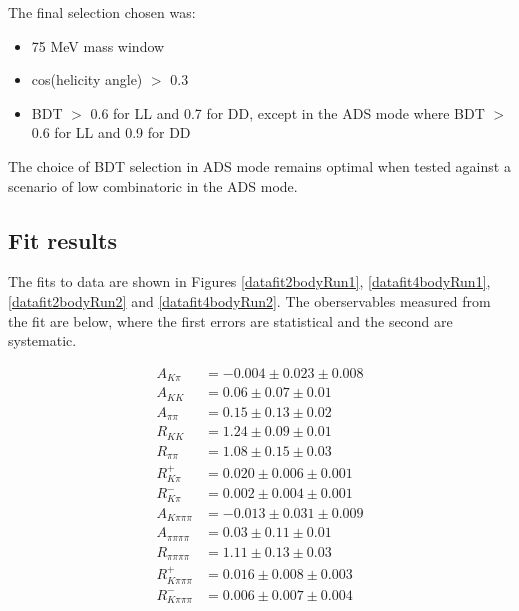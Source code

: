 The final selection chosen was:

\begin{itemize}
\item{75 MeV \Kstar mass window}
\item{\textbar cos(\KS helicity angle) \textbar $>$ 0.3}
\item{BDT $>$ 0.6 for LL and 0.7 for DD, except in the ADS mode where BDT $>$ 0.6 for LL and 0.9 for DD}
\end{itemize}

The choice of BDT selection in ADS mode remains optimal when tested against a scenario of low combinatoric in the ADS mode. 

\subsection{Fit results}
\label{sec:cpfit:results}

The fits to data are shown in Figures \ref{datafit2bodyRun1}, \ref{datafit4bodyRun1}, \ref{datafit2bodyRun2} and \ref{datafit4bodyRun2}. The \CP oberservables measured from the fit are below, where the first errors are statistical and the second are systematic.

\begin{align*}
A_{K\pi} & = -0.004 \pm 0.023 \pm 0.008 \\
A_{KK} & = 0.06 \pm 0.07 \pm 0.01 \\
A_{\pi\pi} & = 0.15 \pm 0.13 \pm 0.02 \\
R_{KK} & = 1.24 \pm 0.09 \pm 0.01 \\
R_{\pi\pi} & = 1.08 \pm 0.15 \pm 0.03 \\
R^+_{K\pi} & = 0.020 \pm 0.006 \pm 0.001 \\
R^-_{K\pi} & = 0.002 \pm 0.004 \pm 0.001 \\
A_{K\pi\pi\pi} & = -0.013 \pm 0.031 \pm 0.009 \\
A_{\pi\pi\pi\pi} & = 0.03 \pm 0.11 \pm 0.01 \\
R_{\pi\pi\pi\pi} & = 1.11 \pm 0.13 \pm 0.03 \\
R^+_{K\pi\pi\pi} & = 0.016 \pm 0.008 \pm 0.003 \\
R^-_{K\pi\pi\pi} & = 0.006 \pm 0.007 \pm 0.004 \\
\end{align*}

